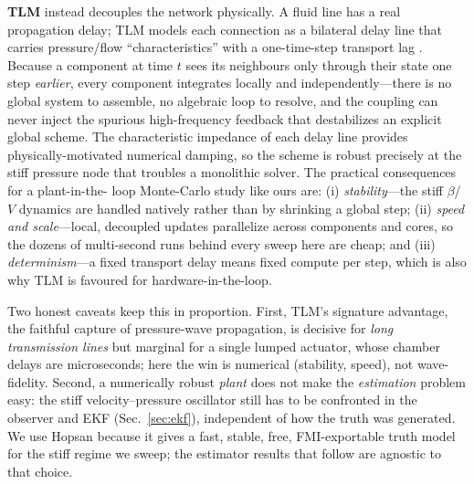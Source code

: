 \documentclass[conference]{IEEEtran}
\begin{document}
\textbf{TLM} instead decouples the network physically. A fluid line has a real
propagation delay; TLM models each connection as a bilateral delay line that
carries pressure/flow ``characteristics'' with a one-time-step transport lag
\cite{johns1971tlm,krus1988tlm,axin2010hopsan}. Because a component at time $t$
sees its neighbours only through their state one step \emph{earlier}, every
component integrates locally and independently---there is no global system to
assemble, no algebraic loop to resolve, and the coupling can never inject the
spurious high-frequency feedback that destabilizes an explicit global scheme. The
characteristic impedance of each delay line provides physically-motivated
numerical damping, so the scheme is robust precisely at the stiff pressure node
that troubles a monolithic solver. The practical consequences for a plant-in-the-
loop Monte-Carlo study like ours are: (i) \emph{stability}---the stiff $\beta$/$V$
dynamics are handled natively rather than by shrinking a global step; (ii)
\emph{speed and scale}---local, decoupled updates parallelize across components and
cores, so the dozens of multi-second runs behind every sweep here are cheap; and
(iii) \emph{determinism}---a fixed transport delay means fixed compute per step,
which is also why TLM is favoured for hardware-in-the-loop.

Two honest caveats keep this in proportion. First, TLM's signature advantage, the
faithful capture of pressure-wave propagation, is decisive for \emph{long
transmission lines} but marginal for a single lumped actuator, whose chamber
delays are microseconds; here the win is numerical (stability, speed), not
wave-fidelity. Second, a numerically robust \emph{plant} does not make the
\emph{estimation} problem easy: the stiff velocity--pressure oscillator still has
to be confronted in the observer and EKF (Sec.~\ref{sec:ekf}), independent of how
the truth was generated. We use Hopsan because it gives a fast, stable, free,
FMI-exportable truth model for the stiff regime we sweep; the estimator results
that follow are agnostic to that choice.
\end{document}
